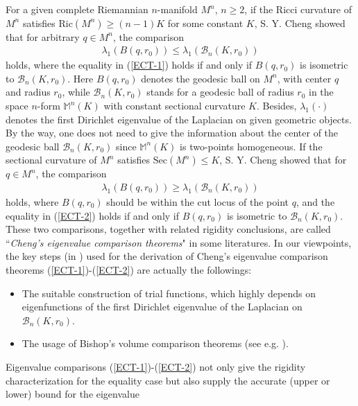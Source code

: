 \documentclass[12pt]{article}
\begin{document}
For a given complete Riemannian $n$-manifold $M^{n}$, $n\geq2$, if
the Ricci curvature of $M^{n}$ satisfies
$\mathrm{Ric}(M^n)\geq(n-1)K$ for some constant $K$,  S. Y. Cheng
\cite{CSY1} showed that for arbitrary $q\in M^{n}$, the comparison
\begin{eqnarray} \label{ECT-1}
\lambda_{1}(B(q,r_0))\leq\lambda_{1}\left(\mathcal{B}_{n}(K,r_0)\right)
\end{eqnarray}
holds, where the equality in (\ref{ECT-1}) holds if and only if
$B(q,r_0)$ is isometric to $\mathcal{B}_{n}(K,r_0)$. Here $B(q,r_0)$
denotes the geodesic ball on $M^{n}$, with center $q$ and radius
$r_0$, while $\mathcal{B}_{n}(K,r_0)$ stands for a geodesic ball of
radius $r_0$ in the space $n$-form $\mathbb{M}^{n}(K)$ with constant
sectional curvature $K$. Besides, $\lambda_{1}(\cdot)$ denotes the
first Dirichlet eigenvalue of the Laplacian on given geometric
objects. By the way, one does not need to give the information about
the center of the geodesic ball $\mathcal{B}_{n}(K,r_0)$ since
$\mathbb{M}^{n}(K)$ is two-points homogeneous. If the sectional
curvature of $M^{n}$ satisfies $\mathrm{Sec}(M^n)\leq K$, S. Y.
Cheng \cite{CSY2} showed that for $q\in M^{n}$, the comparison
\begin{eqnarray} \label{ECT-2}
\lambda_{1}(B(q,r_0))\geq\lambda_{1}\left(\mathcal{B}_{n}(K,r_0)\right)
\end{eqnarray}
holds, where $B(q,r_0)$ should be within the cut locus of the point
$q$, and the equality in (\ref{ECT-2}) holds if and only if
$B(q,r_0)$ is isometric to $\mathcal{B}_{n}(K,r_0)$. These two
comparisons, together  with related rigidity conclusions, are called
``\emph{Cheng's eigenvalue comparison theorems}" in some
literatures. In our viewpoints, the key steps (in \cite{CSY1, CSY2})
used for the derivation of Cheng's eigenvalue comparison theorems
(\ref{ECT-1})-(\ref{ECT-2}) are actually the followings:
\begin{itemize}
\item The suitable construction of trial functions, which highly
depends on eigenfunctions of the first Dirichlet eigenvalue of the
Laplacian on $\mathcal{B}_{n}(K,r_0)$.

\item The usage of Bishop's volume comparison theorems (see e.g. \cite[Chapter III]{IC}).
\end{itemize}
Eigenvalue comparisons (\ref{ECT-1})-(\ref{ECT-2}) not only give the
rigidity characterization for the equality case but also supply the
accurate (upper or lower) bound for the eigenvalue
\end{document}
